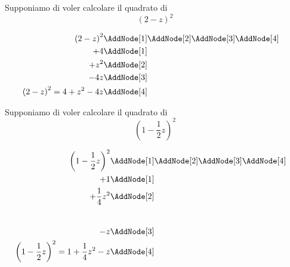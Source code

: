 \begin{esempio}
Supponiamo di voler calcolare il quadrato di \[\left(2-z\right)^2\]
\begin{NodesList}
	\begin{align*}
		\left(2-z\right)^2&\AddNode[1]\AddNode[2]\AddNode[3]\AddNode[4]\\
		+4&\AddNode[1]&\\ 
		+z^2&\AddNode[2]&\\
		-4z&\AddNode[3]\\
		\left(2-z\right)^2=4+z^2-4z&\AddNode[4]
	\end{align*}
\end{NodesList}
\end{esempio}
\begin{esempio}
Supponiamo di voler calcolare il quadrato di \[\left(1-\dfrac{1}{2}z\right)^2\]
\begin{NodesList}
	\begin{align*}
		\left(1-\dfrac{1}{2}z\right)^2&\AddNode[1]\AddNode[2]\AddNode[3]\AddNode[4]\\
		+1&\AddNode[1]&\\ 
		+\dfrac{1}{4}z^2&\AddNode[2]&\\[0.8cm]
		-z&\AddNode[3]\\
		\left(1-\dfrac{1}{2}z\right)^2=1+\dfrac{1}{4}z^2-z&\AddNode[4]
	\end{align*}
\end{NodesList}
\end{esempio}
